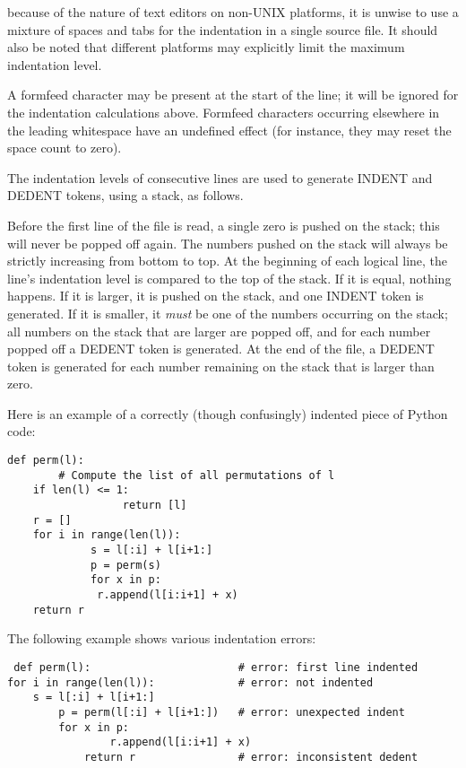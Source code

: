  because of the nature of
text editors on non-UNIX platforms, it is unwise to use a mixture of
spaces and tabs for the indentation in a single source file.  It
should also be noted that different platforms may explicitly limit the
maximum indentation level.

A formfeed character may be present at the start of the line; it will
be ignored for the indentation calculations above.  Formfeed
characters occurring elsewhere in the leading whitespace have an
undefined effect (for instance, they may reset the space count to
zero).

The indentation levels of consecutive lines are used to generate
INDENT and DEDENT tokens, using a stack, as follows.

Before the first line of the file is read, a single zero is pushed on
the stack; this will never be popped off again.  The numbers pushed on
the stack will always be strictly increasing from bottom to top.  At
the beginning of each logical line, the line's indentation level is
compared to the top of the stack.  If it is equal, nothing happens.
If it is larger, it is pushed on the stack, and one INDENT token is
generated.  If it is smaller, it \emph{must} be one of the numbers
occurring on the stack; all numbers on the stack that are larger are
popped off, and for each number popped off a DEDENT token is
generated.  At the end of the file, a DEDENT token is generated for
each number remaining on the stack that is larger than zero.

Here is an example of a correctly (though confusingly) indented piece
of Python code:

\begin{verbatim}
def perm(l):
        # Compute the list of all permutations of l
    if len(l) <= 1:
                  return [l]
    r = []
    for i in range(len(l)):
             s = l[:i] + l[i+1:]
             p = perm(s)
             for x in p:
              r.append(l[i:i+1] + x)
    return r
\end{verbatim}

The following example shows various indentation errors:

\begin{verbatim}
 def perm(l):                       # error: first line indented
for i in range(len(l)):             # error: not indented
    s = l[:i] + l[i+1:]
        p = perm(l[:i] + l[i+1:])   # error: unexpected indent
        for x in p:
                r.append(l[i:i+1] + x)
            return r                # error: inconsistent dedent
\end{verbatim}

